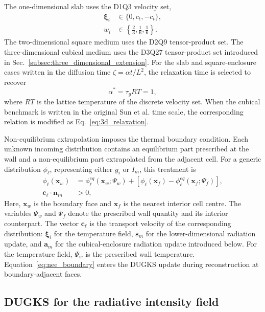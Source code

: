 \documentclass[a4paper,12pt]{ctexart}
\numberwithin{equation}{section}
\newcommand{\vb}[1]{\bm{#1}}
\newcommand{\vx}{\vb{x}}
\newcommand{\vn}{\vb{n}}
\newcommand{\vs}{\vb{s}}
\newcommand{\vc}{\vb{c}}
\newcommand{\vxi}{\bm{\xi}}
\begin{document}
The one-dimensional slab uses the D1Q3 velocity set,
\begin{equation*}
\begin{aligned}
\vxi_i&\in \{0, c_t, -c_t\},
\\
w_i&\in \left\{ \frac{2}{3}, \frac{1}{6}, \frac{1}{6} \right\}.
\end{aligned}
\end{equation*}
The two-dimensional square medium uses the D2Q9 tensor-product set. The three-dimensional cubical medium uses the D3Q27 tensor-product set introduced in Sec.~\ref{subsec:three_dimensional_extension}. For the slab and square-enclosure cases written in the diffusion time $\zeta=\alpha t/L^2$, the relaxation time is selected to recover
\begin{equation*}
\alpha^*=\tau_g RT=1,
\end{equation*}
where $RT$ is the lattice temperature of the discrete velocity set. When the cubical benchmark is written in the original Sun et al. time scale, the corresponding relation is modified as Eq.~\eqref{eq:3d_relaxation}.

Non-equilibrium extrapolation imposes the thermal boundary condition. Each unknown incoming distribution contains an equilibrium part prescribed at the wall and a non-equilibrium part extrapolated from the adjacent cell. For a generic distribution $\phi_\ell$, representing either $g_i$ or $I_m$, this treatment is
\begin{equation}
\begin{aligned}
\phi_\ell(\vx_w)&=\phi_\ell^{eq}(\vx_w;\Psi_w)+\left[\phi_\ell(\vx_f)-\phi_\ell^{eq}(\vx_f;\Psi_f)\right],
\\
\vc_\ell\cdot\vn_{in}&>0,
\end{aligned}
\label{eq:nee_boundary}
\end{equation}
Here, $\vx_w$ is the boundary face and $\vx_f$ is the nearest interior cell centre. The variables $\Psi_w$ and $\Psi_f$ denote the prescribed wall quantity and its interior counterpart. The vector $\vc_\ell$ is the transport velocity of the corresponding distribution: $\vxi_i$ for the temperature field, $\vs_m$ for the lower-dimensional radiation update, and $\vb{a}_m$ for the cubical-enclosure radiation update introduced below. For the temperature field, $\Psi_w$ is the prescribed wall temperature. Equation~\eqref{eq:nee_boundary} enters the DUGKS update during reconstruction at boundary-adjacent faces.

\subsection{DUGKS for the radiative intensity field}
\label{subsec:radiation_dugks}
\end{document}
